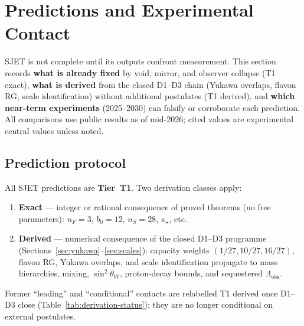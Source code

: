 \section{Predictions and Experimental Contact}
\label{sec:predictions}

SJET is not complete until its outputs confront measurement. This section
records \textbf{what is already fixed} by void, mirror, and observer collapse
(T1 exact), \textbf{what is derived} from the closed D1--D3 chain (Yukawa
overlaps, flavon RG, scale identification) without additional postulates
(T1 derived), and \textbf{which near-term experiments} (2025--2030) can
falsify or corroborate each prediction. All comparisons use public results as
of mid-2026; cited values are experimental central values unless noted.

\subsection{Prediction protocol}
\label{sec:predictions:protocol}

\begin{definition}\label{def:prediction-tiers}
All SJET predictions are \textbf{Tier~T1}. Two derivation classes apply:
\begin{enumerate}[label=\textbf{T1 (\alph*).},leftmargin=*]
  \item \textbf{Exact} --- integer or rational consequence of proved theorems
    (no free parameters): $n_F=3$, $b_0=12$, $n_S=28$, $\kappa_\star$, etc.
  \item \textbf{Derived} --- numerical consequence of the closed D1--D3
    programme (Sections~\ref{sec:yukawa}--\ref{sec:scales}): capacity weights
    $(1/27,10/27,16/27)$, flavon RG, Yukawa overlaps, and scale
    identification propagate to mass hierarchies, mixing, $\sin^2\theta_W$,
    proton-decay bounds, and sequestered $\Lambda_{\mathrm{obs}}$.
\end{enumerate}
Former ``leading'' and ``conditional'' contacts are relabelled T1 derived once
D1--D3 close (Table~\ref{tab:derivation-status}); they are no longer
conditional on external postulates.
\end{definition}

